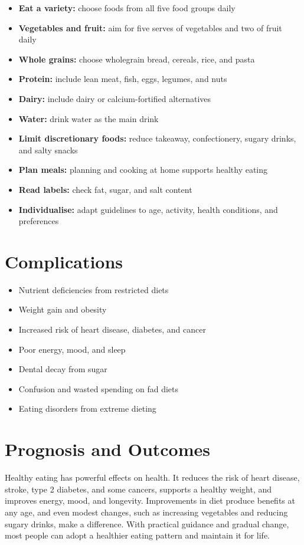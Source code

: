 \begin{itemize}
    \item \textbf{Eat a variety:} choose foods from all five food groups daily
    \item \textbf{Vegetables and fruit:} aim for five serves of vegetables and two of fruit daily
    \item \textbf{Whole grains:} choose wholegrain bread, cereals, rice, and pasta
    \item \textbf{Protein:} include lean meat, fish, eggs, legumes, and nuts
    \item \textbf{Dairy:} include dairy or calcium-fortified alternatives
    \item \textbf{Water:} drink water as the main drink
    \item \textbf{Limit discretionary foods:} reduce takeaway, confectionery, sugary drinks, and salty snacks
    \item \textbf{Plan meals:} planning and cooking at home supports healthy eating
    \item \textbf{Read labels:} check fat, sugar, and salt content
    \item \textbf{Individualise:} adapt guidelines to age, activity, health conditions, and preferences
\end{itemize}

\section*{Complications}
\begin{itemize}
    \item Nutrient deficiencies from restricted diets
    \item Weight gain and obesity
    \item Increased risk of heart disease, diabetes, and cancer
    \item Poor energy, mood, and sleep
    \item Dental decay from sugar
    \item Confusion and wasted spending on fad diets
    \item Eating disorders from extreme dieting
\end{itemize}

\section*{Prognosis and Outcomes}
Healthy eating has powerful effects on health. It reduces the risk of heart disease, stroke, type 2 diabetes, and some cancers, supports a healthy weight, and improves energy, mood, and longevity. Improvements in diet produce benefits at any age, and even modest changes, such as increasing vegetables and reducing sugary drinks, make a difference. With practical guidance and gradual change, most people can adopt a healthier eating pattern and maintain it for life.

